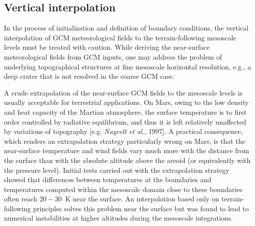 \mk
\subsection{Vertical interpolation}

\sk
In the process of initialization and definition of boundary conditions, the vertical interpolation of GCM meteorological fields to the terrain-following mesoscale levels must be treated with caution. While deriving the near-surface meteorological fields from GCM inputs, one may address the problem of underlying topographical structures at fine mesoscale horizontal resolution, e.g., a deep crater that is not resolved in the coarse GCM case.

\sk
A crude extrapolation of the near-surface GCM fields to the mesoscale levels is usually acceptable for terrestrial applications. On Mars, owing to the low density and heat capacity of the Martian atmosphere, the surface temperature is to first order controlled by radiative equilibrium, and thus it is left relatively unaffected by variations of topography [e.g. \textit{Nayvelt et al.}, 1997]\nocite{Nayv:97}. A practical consequence, which renders an extrapolation strategy particularly wrong on Mars, is that the near-surface temperature and wind fields vary much more with the distance from the surface than with the absolute altitude above the areoid (or equivalently with the pressure level). Initial tests carried out with the extrapolation strategy showed that differences between temperatures at the boundaries and temperatures computed within the mesoscale domain close to these boundaries often reach $20-30$~K near the surface. An interpolation based only on terrain-following principles solves this problem near the surface but was found to lead to numerical instabilities at higher altitudes during the mesoscale integrations.

